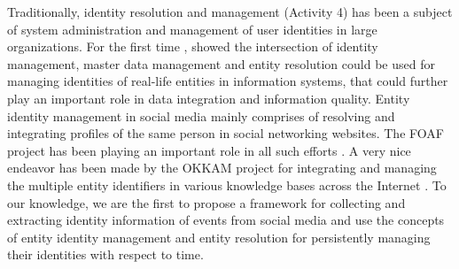 Traditionally, identity resolution and management (Activity 4) has been a subject of system administration and management of user identities in large organizations. For the first time \cite{zhou2011entity}, showed the intersection of identity management, master data management and entity resolution could be used for managing identities of real-life entities in information systems, that could further play an important role in data integration and information quality. Entity identity management in social media mainly comprises of resolving and integrating profiles of the same person in social networking websites. The FOAF project has been playing an important role in all such efforts \cite{bouquet2010entity,bortoli2007foaf,raad2010user}. A very nice endeavor has been made by the OKKAM project for integrating and managing the multiple entity identifiers in various knowledge bases across the Internet \cite{bouquet2006okkam}. To our knowledge, we are the first to propose a framework for collecting and extracting identity information of events from social media and use the concepts of entity identity management and entity resolution for persistently managing their identities with respect to time.

